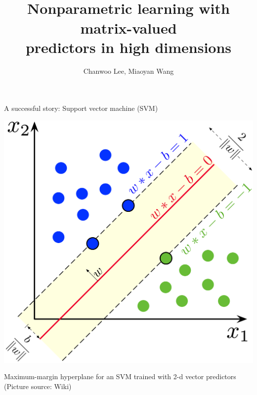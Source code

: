\documentclass[compress,dvipsnames]{beamer}
\begin{document}
\begin{frame}[plain]

\title[Higher-order tensors]{\\
Nonparametric learning with matrix-valued \\
predictors in high dimensions}
\author{Chanwoo Lee, Miaoyan Wang\\
}
\date{}
\titlepage
\end{frame}




\begin{frame}{A successful story: Support vector machine (SVM)}

\centerline{\includegraphics[width=.6\textwidth]{SVM_margin.png}}

Maximum-margin hyperplane for an SVM trained with {\color{red}2-d vector predictors} (Picture source: Wiki)
\end{frame}
\end{document}
